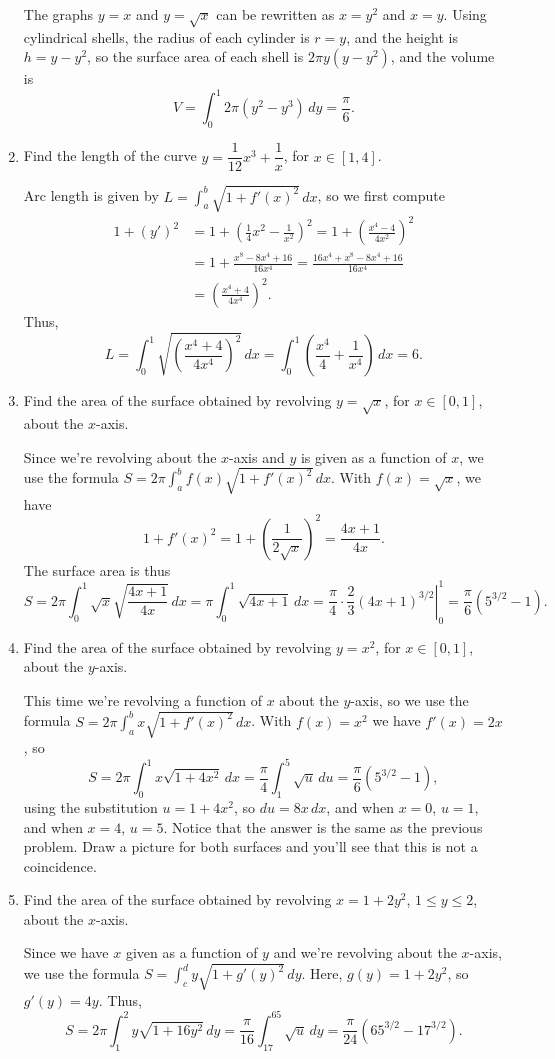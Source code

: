 \documentclass[12pt]{article}
\begin{document}
\begin{enumerate}
The graphs $y=x$ and $y=\sqrt{x}$ can be rewritten as $x=y^2$ and $x=y$. Using cylindrical shells, the radius of each cylinder is $r=y$, and the height is $h = y-y^2$, so the surface area of each shell is $2\pi y(y-y^2)$, and the volume is
\[
 V = \int_0^1 2\pi (y^2-y^3)\,dy = \frac{\pi}{6}.
\]

 \item Find the length of the curve $y=\dfrac{1}{12}x^3+\dfrac{1}{x}$, for $x\in [1,4]$.

\medskip

Arc length is given by $L=\int_a^b\sqrt{1+f'(x)^2}\,dx$, so we first compute
\begin{align*}
 1+(y')^2 & = 1+ \left(\frac{1}{4}x^2-\frac{1}{x^2}\right)^2 = 1+\left(\frac{x^4-4}{4x^2}\right)^2\\
& = 1+\frac{x^8-8x^4+16}{16x^4} = \frac{16x^4+x^8-8x^4+16}{16x^4}\\
& = \left(\frac{x^4+4}{4x^4}\right)^2.
\end{align*}
Thus, 
\[
 L = \int_0^1 \sqrt{\left(\frac{x^4+4}{4x^4}\right)^2}\,dx = \int_0^1 \left(\frac{x^4}{4}+\frac{1}{x^4}\right)\,dx = 6.
\]


 \item Find the area of the surface obtained by revolving $y=\sqrt{x}$, for $x\in [0,1]$, about the $x$-axis.

\medskip

Since we're revolving about the $x$-axis and $y$ is given as a function of $x$, we use the formula $S = 2\pi \int_a^b f(x)\sqrt{1+f'(x)^2}\,dx$. With $f(x)=\sqrt{x}$, we have
\[
 1+f'(x)^2 = 1+\left(\frac{1}{2\sqrt{x}}\right)^2 = \frac{4x+1}{4x}.
\]
The surface area is thus
\[
 S = 2\pi \int_0^1 \sqrt{x}\sqrt{\frac{4x+1}{4x}}\,dx = \pi\int_0^1 \sqrt{4x+1}\,dx = \left.\frac{\pi}{4}\cdot\frac{2}{3}(4x+1)^{3/2}\right|_0^1 = \frac{\pi}{6}(5^{3/2}-1).
\]

 \item Find the area of the surface obtained by revolving $y=x^2$, for $x\in [0,1]$, about the $y$-axis.

\medskip

This time we're revolving a function of $x$ about the $y$-axis, so we use the formula $S=2\pi\int_a^b x\sqrt{1+f'(x)^2}\,dx$. With $f(x)=x^2$ we have $f'(x)=2x$, so
\[
 S = 2\pi\int_0^1 x\sqrt{1+4x^2}\,dx = \frac{\pi}{4}\int_1^5 \sqrt{u}\,du = \frac{\pi}{6}(5^{3/2}-1),
\]
using the substitution $u=1+4x^2$, so $du=8x\,dx$, and when $x=0$, $u=1$, and when $x=4$, $u=5$. Notice that the answer is the same as the previous problem. Draw a picture for both surfaces and you'll see that this is not a coincidence.


 \item Find the area of the surface obtained by revolving $x=1+2y^2$, $1\leq y\leq 2$, about the $x$-axis.

Since we have $x$ given as a function of $y$ and we're revolving about the $x$-axis, we use the formula $S=\int_c^d y\sqrt{1+g'(y)^2}\,dy$. Here, $g(y) = 1+2y^2$, so $g'(y) = 4y$. Thus,
\[
 S = 2\pi\int_1^2 y\sqrt{1+16y^2}\,dy = \frac{\pi}{16}\int_{17}^{65}\sqrt{u}\,dy = \frac{\pi}{24}(65^{3/2}-17^{3/2}).
\]

\end{enumerate}
\end{document}
